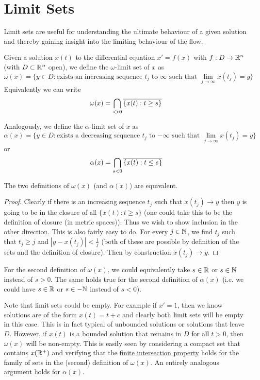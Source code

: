 \section{Limit Sets}
Limit sets are useful for understanding the ultimate behaviour of a given solution and thereby gaining insight into the limiting behaviour of the flow. 
\begin{definition}
Given a solution $x(t)$ to the differential equation $x' = f(x)$ with $f: D \to \mathbb{R}^n$ (with $D \subset \mathbb{R}^n$ open), we define the $\omega$-limit set of $x$ as
$$ \omega(x) = \{ y \in D : \text{exists an increasing sequence $t_j$ to $\infty$ such that } \lim_{j \to \infty} x(t_j) = y \} $$
Equivalently we can write
$$ \omega(x) = \bigcap_{s > 0} \overline{\left\{x(t): t \geq s\right\}} $$

Analogously, we define the $\alpha$-limit set of $x$ as
$$ \alpha(x) = \{ y \in D : \text{exists a decreasing sequence $t_j$ to $-\infty$ such that } \lim_{j \to \infty} x(t_j) = y \} $$
or
$$ \alpha(x) = \bigcap_{s < 0} \overline{\{x(t): t \leq s\}} $$
\end{definition}
\begin{proposition}\label{prop:omega-equiv-def}
The two definitions of $\omega(x)$ (and $\alpha(x)$) are equivalent.
\end{proposition}
\begin{proof}
Clearly if there is an increasing sequence $t_j$ such that $x(t_j) \to y$ then $y$ is going to be in the closure of all $\{x(t): t \geq s\}$ (one could take this to be the definition of closure (in metric spaces)). Thus we wish to show inclusion in the other direction. This is also fairly easy to do. For every $j \in \mathbb{N}$, we find $t_j$ such that $t_j \geq j$ and $|y - x(t_j)| < \frac{1}{j}$ (both of these are possible by definition of the sets and the definition of closure). Then by construction $x(t_j) \to y$.
\end{proof}
\begin{remark}
For the second definition of $\omega(x)$, we could equivalently take $s \in \mathbb{R}$ or $s \in \mathbb{N}$ instead of $s > 0$. The same holds true for the second definition of $\alpha(x)$ (i.e. we could have $s \in \mathbb{R}$ or $s \in -\mathbb{N}$ instead of $s < 0$).
\end{remark}

Note that limit sets could be empty. For example if $x' = 1$, then we know solutions are of the form $x(t) = t + c$ and clearly both limit sets will be empty in this case. This is in fact typical of unbounded solutions or solutions that leave $D$. However, if $x(t)$ is a bounded solution that remains in $D$ for all $t > 0$, then $\omega(x)$ will be non-empty. This is easily seen by considering a compact set that contains $x(\mathbb{R}^+)$ and verifying that the \href{https://en.wikipedia.org/wiki/Finite_intersection_property#Applications}{finite intersection property} holds for the family of sets in the (second) definition of $\omega(x)$. An entirely analogous argument holds for $\alpha(x)$.

